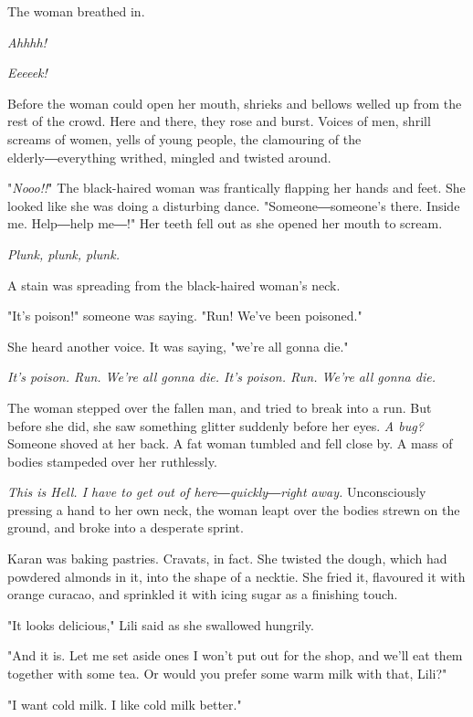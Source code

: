 The woman breathed in.

\emph{Ahhhh!}

\emph{Eeeeek!}

Before the woman could open her mouth, shrieks and bellows welled up
from the rest of the crowd. Here and there, they rose and burst. Voices
of men, shrill screams of women, yells of young people, the clamouring
of the elderly―everything writhed, mingled and twisted around.

"\emph{Nooo!!}" The black-haired woman was frantically flapping her hands and
feet. She looked like she was doing a disturbing dance.
"Someone―someone's there. Inside me. Help―help me―!" Her teeth fell out
as she opened her mouth to scream.

\emph{Plunk, plunk, plunk.}

A stain was spreading from the black-haired woman's neck.

"It's poison!" someone was saying. "Run! We've been poisoned."

She heard another voice. It was saying, "we're all gonna die."

\emph{It's poison. Run. We're all gonna die. It's poison. Run. We're all gonna
	die.}

The woman stepped over the fallen man, and tried to break into a run.
But before she did, she saw something glitter suddenly before her eyes.
\emph{A bug?} Someone shoved at her back. A fat woman tumbled and fell close
by. A mass of bodies stampeded over her ruthlessly.

\emph{This is Hell. I have to get out of here―quickly―right away.}
Unconsciously pressing a hand to her own neck, the woman leapt over the
bodies strewn on the ground, and broke into a desperate sprint.


Karan was baking pastries. Cravats, in fact. She twisted the dough,
which had powdered almonds in it, into the shape of a necktie. She fried
it, flavoured it with orange curacao, and sprinkled it with icing sugar
as a finishing touch.

"It looks delicious," Lili said as she swallowed hungrily.

"And it is. Let me set aside ones I won't put out for the shop, and
we'll eat them together with some tea. Or would you prefer some warm
milk with that, Lili?"

"I want cold milk. I like cold milk better."

